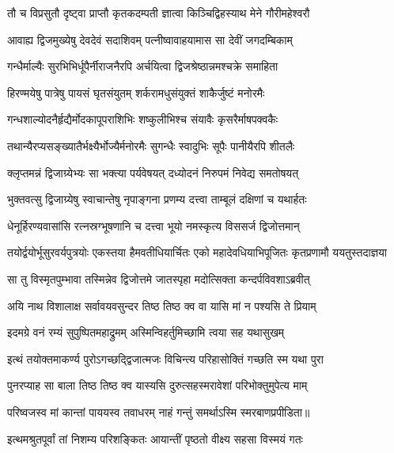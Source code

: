 \twolineshloka
{तौ च विप्रसुतौ दृष्ट्वा प्राप्तौ कृतकदम्पती}
{ज्ञात्वा किञ्चिद्विहस्याथ मेने गौरीमहेश्वरौ} %

\twolineshloka
{आवाह्य द्विजमुख्येषु देवदेवं सदाशिवम्}
{पत्नीष्वावाहयामास सा देवीं जगदम्बिकाम्} %

\twolineshloka
{गन्धैर्माल्यैः सुरभिभिर्धूपैर्नीराजनैरपि}
{अर्चयित्वा द्विजश्रेष्ठान्नमश्चक्रे समाहिता} %

\twolineshloka
{हिरण्मयेषु पात्रेषु पायसं घृतसंयुतम्}
{शर्करामधुसंयुक्तं शाकैर्जुष्टं मनोरमैः} %

\twolineshloka
{गन्धशाल्योदनैर्हृद्यैर्मोदकापूपराशिभिः}
{शष्कुलीभिश्च संयावैः कृसरैर्माषपक्वकैः} %

\twolineshloka
{तथान्यैरप्यसङ्ख्यातैर्भक्ष्यैर्भोज्यैर्मनोरमैः}
{सुगन्धैः स्वादुभिः सूपैः पानीयैरपि शीतलैः} %

\twolineshloka
{क्लृप्तमन्नं द्विजाग्र्येभ्यः सा भक्त्या पर्यवेषयत्}
{दध्योदनं निरुपमं निवेद्य समतोषयत्} %

\twolineshloka
{भुक्तवत्सु द्विजाग्र्येषु स्वाचान्तेषु नृपाङ्गना}
{प्रणम्य दत्त्वा ताम्बूलं दक्षिणां च यथार्हतः} %

\twolineshloka
{धेनूर्हिरण्यवासांसि रत्नस्रग्भूषणानि च}
{दत्त्वा भूयो नमस्कृत्य विससर्ज द्विजोत्तमान्} %

\fourlineindentedshloka
{तयोर्द्वयोर्भूसुरवर्यपुत्रयोः}
{एकस्तया हैमवतीधियार्चितः}
{एको महादेवधियाभिपूजितः}
{कृतप्रणामौ ययतुस्तदाज्ञया} %

\twolineshloka
{सा तु विस्मृतपुम्भावा तस्मिन्नेव द्विजोत्तमे}
{जातस्पृहा मदोत्सिक्ता कन्दर्पविवशाऽब्रवीत्} %

\twolineshloka
{अयि\footnotemark{} नाथ विशालाक्ष सर्वावयवसुन्दर}
{तिष्ठ तिष्ठ क्व वा यासि मां न पश्यसि ते प्रियाम्} %

\twolineshloka
{इदमग्रे वनं रम्यं सुपुष्पितमहाद्रुमम्}
{अस्मिन्विहर्तुमिच्छामि त्वया सह यथासुखम्} %

\twolineshloka
{इत्थं तयोक्तमाकर्ण्य पुरोऽगच्छद्द्विजात्मजः}
{विचिन्त्य परिहासोक्तिं गच्छति स्म यथा पुरा} %

\twolineshloka
{पुनरप्याह सा बाला तिष्ठ तिष्ठ क्व यास्यसि}
{दुरुत्सहस्मरावेशां परिभोक्तुमुपेत्य माम्} %

\twolineshloka
{परिष्वजस्व मां कान्तां पाययस्व तवाधरम्}
{नाहं गन्तुं समर्थाऽस्मि स्मरबाणप्रपीडिता॥} %

\twolineshloka
{इत्थमश्रुतपूर्वां तां निशम्य परिशङ्कितः}
{आयान्तीं पृष्ठतो वीक्ष्य सहसा विस्मयं गतः} %

